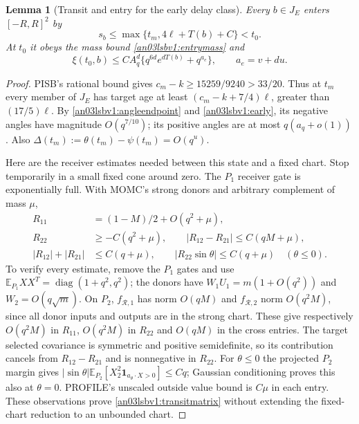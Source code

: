 \documentclass[11pt]{article}
\newtheorem{lemma}[theorem]{Lemma}
\theoremstyle{remark}\newtheorem{remark}[theorem]{Remark}
\newcommand{\E}{\mathbb E}
\newcommand{\one}{\mathbf 1}
\newcommand{\Rhalf}{\mathcal R}
\begin{document}
\begin{lemma}[Transit and entry for the early delay class]
\label{an03lsbv1:transit}
Every $b\in J_E$ enters $[-R,R]^2$ by
\begin{equation}
 s_b\le\max\{t_m,4\ell+T(b)+C\}<t_0.
 \label{an03lsbv1:arrivaltime}
\end{equation}
At $t_0$ it obeys the mass bound \eqref{an03lsbv1:entrymass} and
\begin{equation}
 \xi(t_0,b)\le C A_q^d
       \{q^{6d}e^{dT(b)}+q^{a_e}\},\qquad a_e=v+du.
 \label{an03lsbv1:massshape}
\end{equation}
\end{lemma}
\begin{proof}
PISB's rational bound gives
$c_m-k\ge15259/9240>33/20$. Thus at $t_m$ every member of $J_E$
has target age at least $(c_m-k+7/4)\ell$, greater than
$(17/5)\ell$. By \eqref{an03lsbv1:angleendpoint} and
\eqref{an03lsbv1:early}, its negative angles have magnitude
$O(q^{7/10})$; its positive angles are at most $q(a_q+o(1))$.
Also $\Delta(t_m):=\theta(t_m)-\psi(t_m)=O(q^u)$.

Here are the receiver estimates needed between this state and a
fixed chart. Stop temporarily in a small fixed cone around zero.
The $P_1$ receiver gate is exponentially full. With MOMC's strong
donors and arbitrary complement of mass $\mu$,
\begin{align}
 R_{11}&=(1-M)/2+O(q^2+\mu),\nonumber\\
 R_{22}&\ge-C(q^2+\mu),\qquad
 |R_{12}-R_{21}|\le C(qM+\mu),\nonumber\\
 |R_{12}|+|R_{21}|&\le C(q+\mu),\qquad
 |R_{22}\sin\theta|\le C(q+\mu)\quad(\theta\le0).
 \label{an03lsbv1:transitmatrix}
\end{align}
To verify every estimate, remove the $P_1$ gates and use
$\E_{P_1}XX^T=\operatorname{diag}(1+q^2,q^2)$;
the donors have $W_1U_1=m(1+O(q^2))$ and $W_2=O(q\sqrt m)$.
On $P_2$, $f_{\Rhalf,1}$ has norm $O(qM)$ and
$f_{\Rhalf,2}$ norm $O(q^2M)$, since all donor inputs and outputs
are in the strong chart. These give respectively $O(q^2M)$ in
$R_{11}$, $O(q^2M)$ in $R_{22}$ and $O(qM)$ in the cross entries.
The target selected covariance is symmetric and positive
semidefinite, so its contribution cancels from $R_{12}-R_{21}$
and is nonnegative in $R_{22}$.
For $\theta\le0$ the projected $P_2$ margin gives
$|\sin\theta|\E_{P_2}[X_2^2\one_{a_\theta\cdot X>0}]
\le Cq$; Gaussian conditioning proves this also at $\theta=0$.
PROFILE's unscaled outside value bound is $C\mu$ in each entry.
These observations prove \eqref{an03lsbv1:transitmatrix} without
extending the fixed-chart reduction to an unbounded chart.


\end{proof}
\end{document}
